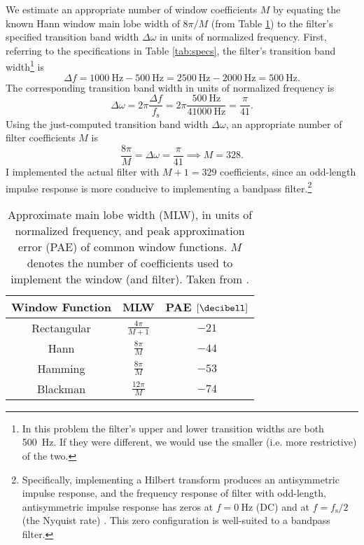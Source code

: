 We estimate an appropriate number of window coefficients $ M $ by equating the known Hann window main lobe width of $ 8 \pi/M $ (from Table \ref{tab:windows}) to the filter's specified transition band width $ \Delta \omega $ in units of normalized frequency.
First, referring to the specifications in Table \ref{tab:specs}, the filter's transition band width\footnote{In this problem the filter's upper and lower transition widths are both \SI{500}{\hertz}.
If they were different, we would use the smaller (i.e. more restrictive) of the two.} is
\begin{equation*}
    \Delta f = \SI{1000}{\hertz} - \SI{500}{\hertz} = \SI{2500}{\hertz} - \SI{2000}{\hertz} = \SI{500}{\hertz}.
\end{equation*}%
The corresponding transition band width in units of normalized frequency is
\begin{equation*}
    \Delta \omega = 2\pi \frac{\Delta f}{f_{\mathrm{s}}} = 2\pi \frac{\SI{500}{\hertz}}{\SI{41000}{\hertz}} = \frac{\pi}{41}.
\end{equation*}
Using the just-computed transition band width $ \Delta \omega $, an appropriate number of filter coefficients $ M $ is
\begin{equation}
    \frac{8 \pi}{M} = \Delta \omega = \frac{\pi}{41} \implies M = 328. \label{eq:kernel_length}
\end{equation}
I implemented the actual filter with $ M + 1 = 329 $ coefficients, since an odd-length impulse response is more conducive to implementing a bandpass filter.\footnote{Specifically, implementing a Hilbert transform produces an antisymmetric impulse response, and the frequency response of filter with odd-length, antisymmetric impulse response has zeros at $ f = \SI{0}{\hertz} $ (DC) and at $ f = f_{\mathrm{s}}/2 $ (the Nyquist rate) \cite{introdsp}.
This zero configuration is well-suited to a bandpass filter.}

\begin{table}[htb!]
        \centering
        \begin{tabular}{|c|c|c|}
            \hline
            Window Function & MLW & PAE $ [\si{\decibell}] $\\
            \hline
            \hline {\rule{0pt}{2.6ex}} \hspace{-7pt}
            Rectangular & $ \frac{4\pi}{M + 1} $ & $ -21 $\\[0.5ex]
            Hann & $ \frac{8\pi}{M} $ & $ -44 $\\[0.5ex]
            Hamming & $ \frac{8\pi}{M} $ & $ -53 $\\[0.5ex]
            Blackman & $ \frac{12 \pi}{M} $ & $ -74 $\\[0.3ex]
            \hline
        \end{tabular}     
        \caption{Approximate main lobe width (MLW), in units of normalized frequency, and peak approximation error (PAE) of common window functions.
        $ M $ denotes the number of coefficients used to implement the window (and filter).
        Taken from \cite{proakis}.}
        \label{tab:windows}
\end{table}

